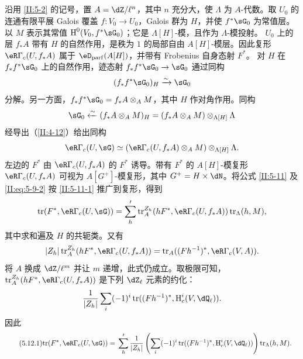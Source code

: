 \subsection{}\label{II:5-12}
沿用 \ref{II:5-2} 的记号，置 $A=\dZ/\ell^n$，其中 $n$ 充分大，使 $\Lambda$ 为 $A$-代数。取 $U_0$ 的连通有限平展 Galois 覆盖 $f:V_0\to U_0$，Galois 群为 $H$，并使 $f^*\sG_0$ 为常值层。以 $M$ 表示其常值 $\h^0(V_0,f^*\sG_0)$；它是 $\Lambda[H]$-模，且作为 $\Lambda$-模投射。
$U_0$ 上的层 $f_*A$ 带有 $H$ 的自然作用，是秩为 $1$ 的局部自由 $A[H]$-模层。因此复形 $\eR\Gamma_c(U,f_*A)$ 属于 $\eD_{\mathrm{parf}}(A[H])$，并带有 Frobenius 自身态射 $F^*$。
对 $H$ 在 $f_*f^*\sG_0$ 上的自然作用，迹态射 $f_*f^*\sG_0\to\sG_0$ 通过同构
\[(f_*f^*\sG_0)_H\iso\sG_0\]
分解。另一方面，$f_*f^*\sG_0=f_*A\otimes_A M$，其中 $H$ 作对角作用。同构
\[\sG_0\xleftarrow{\sim}(f_*A\otimes_A M)_H=(f_*A\otimes_A M)\otimes_{\Lambda[H]}\Lambda\]
经导出（\ref{II:4-12}）给出同构
\[\eR\Gamma_c(U,\sG)\simeq\left(\eR\Gamma_c(U,f_*A)\otimes_A M\right)\otimes_{\Lambda[H]}\Lambda.\]
左边的 $F^*$ 由 $\eR\Gamma_c(U,f_*A)$ 的 $F^*$ 诱导。带有 $F^*$ 的 $A[H]$-模复形 $\eR\Gamma_c(U,f_*A)$ 可视为 $A[G^+]$-模复形，其中 $G^+=H\times\dN$。将公式 \ref{II:5-11} 及 \eqref{II:eq:5-9-2} 按 \ref{II:5-11-1} 推广到复形，得到
\[\tr(F^*,\eR\Gamma_c(U,\sG))=\sum_h'\tr_A^{Z_h}(hF^*,\eR\Gamma_c(U,f_*A))\tr_\Lambda(h,M),\]
其中求和遍及 $H$ 的共轭类。又有
\[|Z_h|\tr_A^{Z_h}(hF^*,\eR\Gamma_c(U,f_*A))=\tr_A((Fh^{-1})^*,\eR\Gamma_c(V,A)).\]
将 $A$ 换成 $\dZ/\ell^m$ 并让 $m$ 递增，此式仍成立。取极限可知，$\tr_A^{Z_h}(hF^*,\eR\Gamma_c(U,f_*A))$ 是下列 $\dZ_\ell$ 元素的约化：
\[\frac1{|Z_h|}\sum_i(-1)^i\tr((Fh^{-1})^*,\h_c^i(V,\dQ_\ell)).\]
因此
\begin{equation*}\tag{5.12.1}\label{II:eq:5-12-1}
\begin{split}
\tr(F^*,\eR\Gamma_c(U,\sG))={}&\sum_h'\frac1{|Z_h|}
\left(\sum_i(-1)^i\tr((Fh^{-1})^*,\h_c^i(V,\dQ_\ell))\right)\tr_\Lambda(h,M).
\end{split}
\end{equation*}

